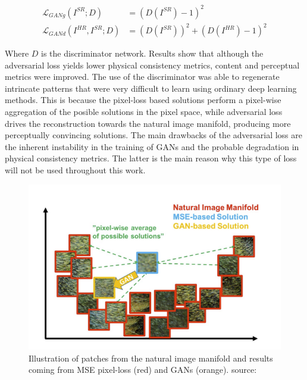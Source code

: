         \begin{equation}
            \begin{aligned}
            \mathcal{L}_{GANg}(I^{SR};D) &= (D(I^{SR}) - 1)^2 \\ 
            \mathcal{L}_{GANd}(I^{HR}, I^{SR};D) &= (D(I^{SR}))^2 + (D(I^{HR}) - 1)^2
            \end{aligned}
        \end{equation}

        Where $D$ is the discriminator network. 
        Results show that although the adversarial loss yields lower physical consistency metrics, content and perceptual metrics were improved. 
        The use of the discriminator was able to regenerate intrincate patterns that were very difficult to learn using ordinary deep learning methods. 
        This is because the pixel-loss based solutions perform a pixel-wise aggregation of the posible solutions in the pixel space, while adversarial loss drives the reconstruction towards the natural image manifold, producing more perceptually convincing solutions. 
        The main drawbacks of the adversarial loss are the inherent instability in the training of GANs and the probable degradation in physical consistency metrics.
        The latter is the main reason why this type of loss will not be used throughout this work.

        \begin{figure}[H]
            \centering
            \includegraphics[width=\textwidth]{Includes/2-gans-natural-manifold.png}
            \caption{Illustration of patches from the natural image manifold and results coming from MSE pixel-loss (red) and GANs (orange). source:\cite{ledig2017photorealistic}}
            \label{fig:2-gans-natural-manifold}
        \end{figure}

















